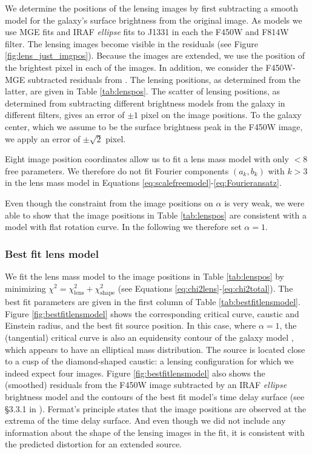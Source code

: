 \documentclass[useAMS,usenatbib]{mnras}
\begin{document}
We determine the positions of the lensing images by first subtracting a smooth model for the galaxy's surface brightness from the original image. As models we use MGE fits and IRAF \emph{ellipse} fits to J1331 in each the F450W and F814W filter. The lensing images become visible in the residuals (see Figure \ref{fig:lens_just_imgpos}). Because the images are extended, we use the position of the brightest pixel in each of the images. In addition, we consider the F450W-MGE subtracted residuals from \citet{SWELLSIII}. The lensing positions, as determined from the latter, are given in Table \ref{tab:lenspos}. The scatter of lensing positions, as determined from subtracting different brightness models from the galaxy in different filters, gives an error of $\pm 1$ pixel on the image positions. To the galaxy center, which we assume to be the surface brightness peak in the F450W image, we apply an error of $\pm \sqrt{2}$ pixel.

Eight image position coordinates allow us to fit a lens mass model with only $<8$ free parameters. We therefore do not fit Fourier components $(a_k,b_k)$ with $k > 3$ in the lens mass model in Equations \eqref{eq:scalefreemodel}-\eqref{eq:Fourieransatz}.

Even though the constraint from the image positions on $\alpha$ is very weak, we were able to show that the image positions in Table \ref{tab:lenspos} are consistent with a model with flat rotation curve. In the following we therefore set $\alpha=1$.

\subsubsection{Best fit lens model} \label{sec:results_lensing_bestfit}

We fit the lens mass model to the image positions in Table \ref{tab:lenspos} by minimizing $\chi^2 = \chi_\text{lens}^2 + \chi_\text{shape}^2$ (see Equations \eqref{eq:chi2lens}-\eqref{eq:chi2total}). The best fit parameters are given in the first column of Table \ref{tab:bestfitlensmodel}. Figure \ref{fig:bestfitlensmodel} shows the corresponding critical curve, caustic and Einstein radius, and the best fit source position. In this case, where $\alpha=1$, the (tangential) critical curve is also an equidensity contour of the galaxy model \citep{EvansWitt}, which appears to have an elliptical mass distribution. The source is located close to a cusp of the diamond-shaped caustic: a lensing configuration for which we indeed expect four images. Figure \ref{fig:bestfitlensmodel} also shows the (smoothed) residuals from the F450W image subtracted by an IRAF \emph{ellipse} brightness model and the contours of the best fit model's time delay surface (see \S 3.3.1 in \citealt{1996astro.ph..6001N}).  Fermat's principle states that the image positions are observed at the extrema of the time delay surface. And even though we did not include any information about the shape of the lensing images in the fit, it is consistent with the predicted distortion for an extended source.
\end{document}
